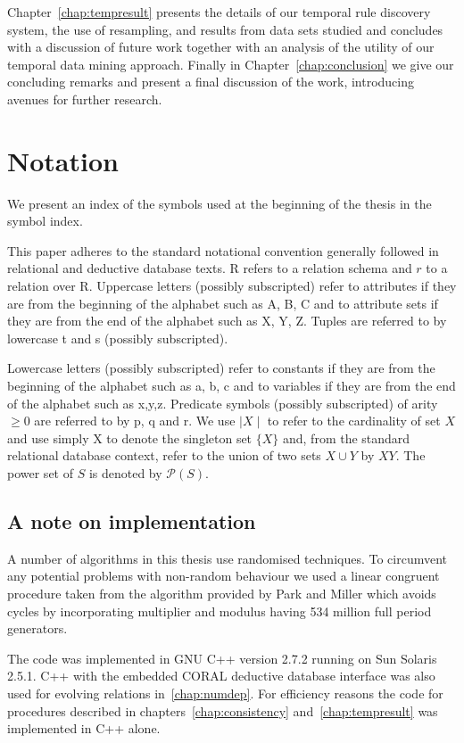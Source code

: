 \medskip

Chapter~\ref{chap:tempresult} presents the details of our temporal
rule discovery system, the use of resampling, and results from data
sets studied and concludes with a discussion of future work together
with an analysis of the utility of our temporal data mining approach.
Finally in Chapter~\ref{chap:conclusion} we give our concluding
remarks and present a final discussion of the work, introducing
avenues for further research.


\section{Notation}


We present an index of the symbols used at the beginning of the thesis
in the symbol index.

\smallskip

This paper adheres to the standard notational convention generally followed in
relational and deductive database texts.  R refers to a relation
schema and $r$ to a relation over R.  Uppercase letters (possibly
subscripted) refer to attributes if they are from the beginning of the
alphabet such as A, B, C and to attribute sets if they are from the
end of the alphabet such as X, Y, Z.  Tuples are referred to by
lowercase t and s (possibly subscripted).

\medskip

Lowercase letters (possibly subscripted) refer to constants if they are from the beginning of the alphabet such as a, b, c and to variables if they are from the end of the alphabet such as x,y,z.  Predicate symbols (possibly subscripted) of arity $\ge 0$ are referred to by
p, q and r. 
We use $\mid X \mid$ to refer to the cardinality of set $X$ and use simply
X to denote the singleton set $\{ X \}$ and, from the standard
relational database context, refer to the union of
two sets $X \cup Y$ by $XY$. The power set of $S$ is
denoted by $\mathcal{P}(S)$. 

\subsection{A note on implementation}

A number of algorithms in this thesis use randomised techniques. To
circumvent any potential problems with non-random behaviour we used
a linear congruent procedure taken
from the algorithm provided by Park and Miller \cite{pm88} which
avoids cycles by incorporating multiplier and modulus
having 534 million full period generators. 

\smallskip
The code was implemented in GNU C++ version 2.7.2 running
on Sun Solaris 2.5.1.  C++ with
the embedded CORAL deductive
database interface \cite{rss92} was also used for evolving relations
in~\ref{chap:numdep}. For efficiency reasons the code for procedures
described in chapters~\ref{chap:consistency} and~\ref{chap:tempresult}
was implemented in C++ alone.


